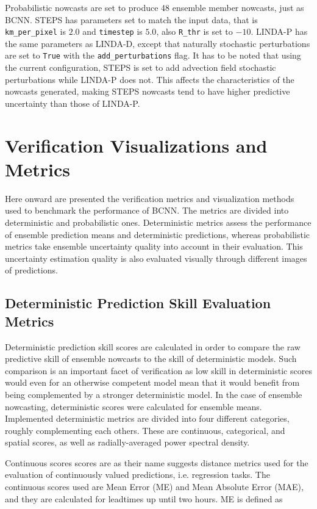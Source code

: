 Probabilistic nowcasts are set to produce 48 ensemble member nowcasts, just as BCNN. STEPS has parameters set to match the input data, that is \texttt{km\_per\_pixel} is $2.0$ and \texttt{timestep} is $5.0$, also \texttt{R\_thr} is set to $-10$. LINDA-P has the same parameters as LINDA-D, except that naturally stochastic perturbations are set to \texttt{True} with the \texttt{add\_perturbations} flag. It has to be noted that using the current configuration, STEPS is set to add advection field stochastic perturbations while LINDA-P does not. This affects the characteristics of the nowcasts generated, making STEPS nowcasts tend to have higher predictive uncertainty than those of LINDA-P.

\section{Verification Visualizations and Metrics}

Here onward are presented the verification metrics and visualization methods used to benchmark the performance of BCNN. The metrics are divided into deterministic and probabilistic ones. Deterministic metrics assess the performance of ensemble prediction means and deterministic predictions, whereas probabilistic metrics take ensemble uncertainty quality into account in their evaluation. This uncertainty estimation quality is also evaluated visually through different images of predictions.

\subsection{Deterministic Prediction Skill Evaluation Metrics}
\label{section:det_metric}

Deterministic prediction skill scores are calculated in order to compare the raw predictive skill of ensemble nowcasts to the skill of deterministic models. Such comparison is an important facet of verification as low skill in deterministic scores would even for an otherwise competent model mean that it would benefit from being complemented by a stronger deterministic model. In the case of ensemble nowcasting, deterministic scores were calculated for ensemble means. Implemented deterministic metrics are divided into four different categories, roughly complementing each others. These are continuous, categorical, and spatial scores, as well as radially-averaged power spectral density.  

Continuous scores scores are as their name suggests distance metrics used for the evaluation of continuously valued predictions, i.e. regression tasks. The continuous scores used are Mean Error (ME) and Mean Absolute Error (MAE), and they are calculated for leadtimes up until two hours. ME is defined as 

